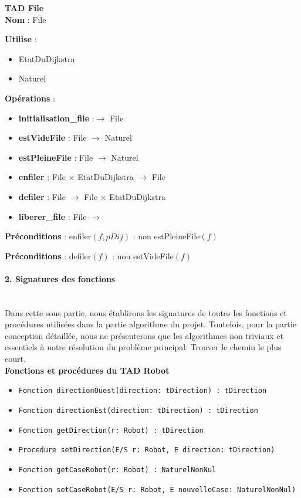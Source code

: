 \documentclass[11pt,a4paper]{article}
\begin{document}
\textbf{TAD File} \\
\noindent\textbf{Nom} : File

\noindent\textbf{Utilise} :
\begin{itemize}
    \item EtatDuDijkstra
    \item Naturel
\end{itemize}
\noindent\textbf{Opérations} :
\begin{itemize}
    \item \textbf{initialisation\_file} :$\rightarrow$ File 
    \item \textbf{estVideFile} : File $\rightarrow$ Naturel
    \item \textbf{estPleineFile} :  File $\rightarrow$ Naturel
    \item \textbf{enfiler} : File $\times$ EtatDuDijkstra $\rightarrow$ File
    \item \textbf{defiler} : File $\rightarrow$ File $\times$ EtatDuDijkstra
    \item \textbf{liberer\_file} : File $\rightarrow$
\end{itemize}
\noindent\textbf{Préconditions} :
enfiler$(f, pDij)$ : non estPleineFile$(f)$

\noindent\textbf{Préconditions} :
defiler$(f)$ : non estVideFile$(f)$

\paragraph{2. Signatures des fonctions}\mbox{} \\[5pt] 
Dans cette sous partie, nous établirons les signatures de toutes les fonctions et procédures utilisées dans la partie algorithme du projet.
Toutefois, pour la partie conception détaillée, nous ne présenterons que les algorithmes non triviaux et essentiels à notre résolution du problème principal: Trouver le chemin le plus court.\\

\textbf{Fonctions et procédures du TAD Robot}
\begin{itemize}
    \item\texttt{Fonction directionOuest(direction: tDirection) : tDirection}
    \newline
    \item\texttt{Fonction directionEst(direction: tDirection) : tDirection}
    \newline
    \item\texttt{Fonction getDirection(r: Robot) : tDirection}
    \newline
    \item\texttt{Procedure setDirection(E/S r: Robot, E direction: tDirection)}
    \newline
    \item\texttt{Fonction getCaseRobot(r: Robot) : NaturelNonNul}
    \newline
    \item\texttt{Fonction setCaseRobot(E/S r: Robot, E nouvelleCase: NaturelNonNul)}
\end{itemize}
\end{document}
